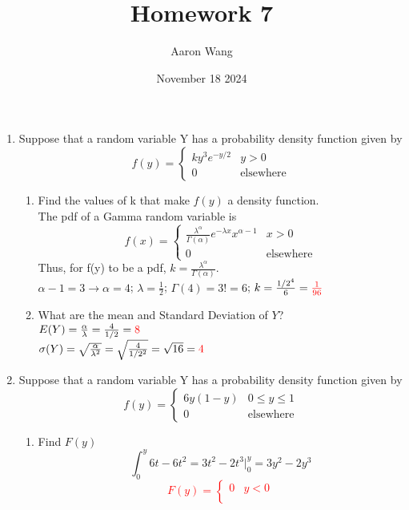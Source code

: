 \documentclass{article}
\title{Homework 7}
\author{Aaron Wang}
\date{November 18 2024}
\begin{document}
\maketitle
\begin{enumerate}
    \item Suppose that a random variable Y has a probability density function given by
    \[
    f(y)=
    \begin{cases}
        ky^3e^{-y/2} & y > 0 \\
        0 & \text{elsewhere}
    \end{cases}
    \]
    \begin{enumerate}
        \item Find the values of k that make $f(y)$ a density function.\\
        The pdf of a Gamma random variable is
        \[
        f(x)=
        \begin{cases}
            \frac{\lambda^{\alpha}}{\Gamma(\alpha)}e^{-\lambda x}x^{\alpha-1} & x > 0 \\
            0 & \text{elsewhere}
        \end{cases}
        \]
        Thus, for f(y) to be a pdf, $k = \frac{\lambda^{\alpha}}{\Gamma(\alpha)}$.\\
        $\alpha-1=3 \rightarrow \alpha = 4$; $\lambda=\frac{1}{2}$; $\Gamma(4)=3!=6$;
        $k=\frac{1/2^{4}}{6}=\textcolor{red}{\frac{1}{96}}$
        \item What are the mean and Standard Deviation of $Y$?\\
        $E(Y)=\frac{\alpha}{\lambda}=\frac{4}{1/2}=\textcolor{red}{8}$\\
        $\sigma(Y)=\sqrt{\frac{\alpha}{\lambda^2}}=\sqrt{\frac{4}{1/2^2}}=\sqrt{16}=\textcolor{red}{4}$
    \end{enumerate}
    \item Suppose that a random variable Y has a probability density function given by
    \[
    f(y)=
    \begin{cases}
        6y(1-y) & 0 \leq y \leq 1\\
        0 & \text{elsewhere}
    \end{cases}
    \]
    \begin{enumerate}
        \item Find $F(y)$
        \[
        \int_0^y6t-6t^2=3t^2-2t^3\Big|_0^y=3y^2-2y^3
        \]
        \textcolor{red}{\[
        F(y)=
        \begin{cases}
        0 & y < 0\\

\end{cases}\]}
\end{enumerate}
\end{enumerate}
\end{document}
